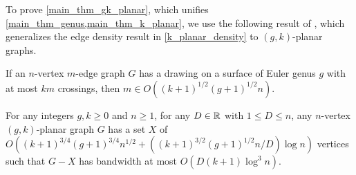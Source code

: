 \documentclass{patmorin}
\renewcommand{\le}{\leqslant}
\renewcommand{\geq}{\geqslant}
\renewcommand{\leq}{\leqslant}
\newcommand{\david}[1]{{\color{orange} David: #1}}
\newcommand{\pat}[1]{\textcolor{Blue}{Pat: #1}}
\begin{document}



%



To prove \cref{main_thm_gk_planar}, which unifies \cref{main_thm_genus,main_thm_k_planar}, we use the following result of \citet{OOW19}, which generalizes the edge density result in \cref{k_planar_density} to $(g,k)$-planar graphs.

\begin{lem}
\label{SurfaceDensity}
If an $n$-vertex $m$-edge graph $G$ has a drawing on a surface of
Euler genus $g$ with at most $km$ crossings, then $m\in O((k+1)^{1/2}(g+1)^{1/2}n)$.
\end{lem}

\begin{lem}
\label{gkPlanar}
For any integers $g,k\geq 0$ and $n\geq 1$, for any $D\in\mathbb{R}$ with $1\leq D\leq n$, any $n$-vertex $(g,k)$-planar graph $G$ has a set $X$ of $O((k+1)^{3/4}(g+1)^{3/4}n^{1/2} + ((k+1)^{3/2}(g+1)^{1/2}n/D)\log n)$ vertices such that $G-X$ has bandwidth at most $O(D(k+1)\log^3 n)$.
\end{lem}
\end{document}
